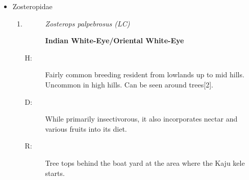 \begin{itemize}
\begin{enumerate}
%
\end{enumerate}%
\item%
Zosteropidae%
\begin{enumerate}%
\item%
\begin{description}%
\item[]%
\textit{Zosterops palpebrosus (LC)}%
\item[]%
\textbf{Indian White{-}Eye/Oriental White{-}Eye}%
\end{description}%
\begin{description}%
\item[H: ]%
Fairly common breeding resident from lowlands up to mid hills. Uncommon in high hills. Can be seen around trees{[}2{]}.%
\item[D: ]%
While primarily insectivorous, it also incorporates nectar and various fruits into its diet.%
\item[R: ]%
Tree tops behind the boat yard at the area where the Kaju kele starts.%
\end{description}%
\end{enumerate}%
\end{itemize}
